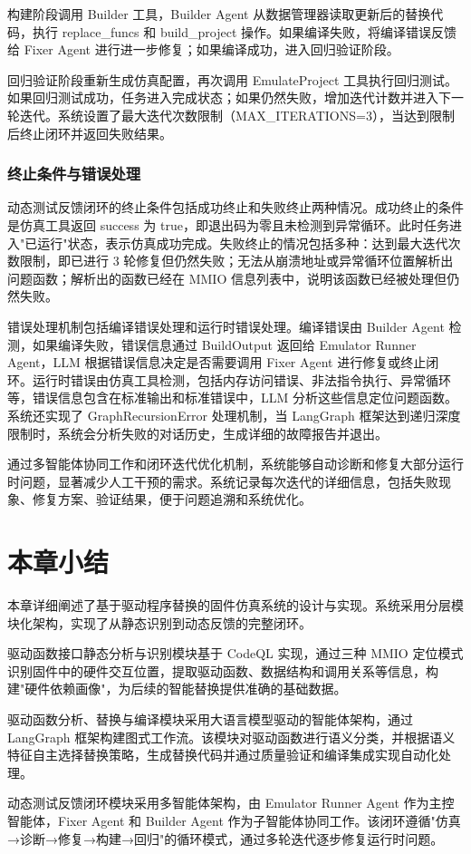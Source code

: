 构建阶段调用 Builder 工具，Builder Agent 从数据管理器读取更新后的替换代码，执行 replace\_funcs 和 build\_project 操作。如果编译失败，将编译错误反馈给 Fixer Agent 进行进一步修复；如果编译成功，进入回归验证阶段。

回归验证阶段重新生成仿真配置，再次调用 EmulateProject 工具执行回归测试。如果回归测试成功，任务进入完成状态；如果仍然失败，增加迭代计数并进入下一轮迭代。系统设置了最大迭代次数限制（MAX\_ITERATIONS=3），当达到限制后终止闭环并返回失败结果。

\subsubsection{终止条件与错误处理}

动态测试反馈闭环的终止条件包括成功终止和失败终止两种情况。成功终止的条件是仿真工具返回 success 为 true，即退出码为零且未检测到异常循环。此时任务进入"已运行"状态，表示仿真成功完成。失败终止的情况包括多种：达到最大迭代次数限制，即已进行 3 轮修复但仍然失败；无法从崩溃地址或异常循环位置解析出问题函数；解析出的函数已经在 MMIO 信息列表中，说明该函数已经被处理但仍然失败。

错误处理机制包括编译错误处理和运行时错误处理。编译错误由 Builder Agent 检测，如果编译失败，错误信息通过 BuildOutput 返回给 Emulator Runner Agent，LLM 根据错误信息决定是否需要调用 Fixer Agent 进行修复或终止闭环。运行时错误由仿真工具检测，包括内存访问错误、非法指令执行、异常循环等，错误信息包含在标准输出和标准错误中，LLM 分析这些信息定位问题函数。系统还实现了 GraphRecursionError 处理机制，当 LangGraph 框架达到递归深度限制时，系统会分析失败的对话历史，生成详细的故障报告并退出。

通过多智能体协同工作和闭环迭代优化机制，系统能够自动诊断和修复大部分运行时问题，显著减少人工干预的需求。系统记录每次迭代的详细信息，包括失败现象、修复方案、验证结果，便于问题追溯和系统优化。

\section{本章小结}
\label{sec:design_summary}

本章详细阐述了基于驱动程序替换的固件仿真系统的设计与实现。系统采用分层模块化架构，实现了从静态识别到动态反馈的完整闭环。

驱动函数接口静态分析与识别模块基于 CodeQL 实现，通过三种 MMIO 定位模式识别固件中的硬件交互位置，提取驱动函数、数据结构和调用关系等信息，构建"硬件依赖画像"，为后续的智能替换提供准确的基础数据。

驱动函数分析、替换与编译模块采用大语言模型驱动的智能体架构，通过 LangGraph 框架构建图式工作流。该模块对驱动函数进行语义分类，并根据语义特征自主选择替换策略，生成替换代码并通过质量验证和编译集成实现自动化处理。

动态测试反馈闭环模块采用多智能体架构，由 Emulator Runner Agent 作为主控智能体，Fixer Agent 和 Builder Agent 作为子智能体协同工作。该闭环遵循"仿真→诊断→修复→构建→回归"的循环模式，通过多轮迭代逐步修复运行时问题。
